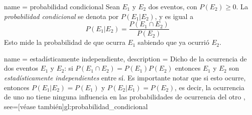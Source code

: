 {
  name = probabilidad condicional
}
{%
  Sean $ E_1 $ y $ E_2 $ dos eventos, con $ P(E_2) \ge 0 $. La
  \textit{probabilidad condicional} se denota por $ P(E_1 | E_2) $, y es
  igual a
  $$ P(E_1 | E_2) = \frac{P(E_1 \cap E_2)}{P(E_2)} $$
  Esto mide la probabilidad de que ocurra $ E_1 $ sabiendo que ya ocurrió
  $ E_2 $.
}

{
  name = estadísticamente independiente,
  description = {
    Dicho de la ocurrencia de dos eventos $ E_1 $ y $ E_2 $: si
    $ P(E_1 \cap E_2) = P(E_1) P(E_2) $ entonces $ E_1 $ y $ E_2 $ son
    \textit{estadísticamente independientes} entre sí. Es importante notar
    que si esto ocurre, entonces $ P(E_1 | E_2) = P(E_1) $ y
    $ P(E_2 | E_1) = P(E_2) $, es decir, la ocurrencia de uno no tiene ninguna
    influencia en las probabilidades de ocurrencia del otro%
  },
  see=[véase también]{gl:probabilidad_condicional}
}

\glsaddall
